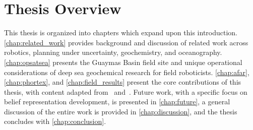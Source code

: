 \section{Thesis Overview}
This thesis is organized into chapters which expand upon this introduction. \cref{chap:related_work} provides background and discussion of related work across robotics, planning under uncertainty, geochemistry, and oceanography. \cref{chap:opsatsea} presents the Guaymas Basin field site and unique operational considerations of deep sea geochemical research for field roboticists. \cref{chap:afar}, \cref{chap:phortex}, and \cref{chap:field_results} present the core contributions of this thesis, with content adapted from~\cite{preston2022discovering} and~\cite{preston2022physically}. Future work, with a specific focus on belief representation development, is presented in \cref{chap:future}, a general discussion of the entire work is provided in \cref{chap:discussion}, and the thesis concludes with \cref{chap:conclusion}.

